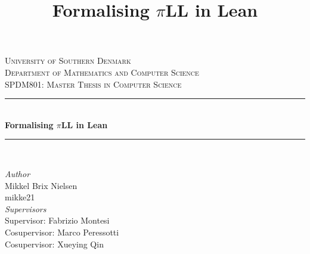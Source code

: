\documentclass[
    final,
    highlight, %
    british, %
    a4paper, %
    acmsmall, %
    acmthm, %
    natbib, %
    screen, %
    review, %
    nonacm, %
]{acmart}
\title[Formalising \texorpdfstring{$\pi$}{pi}LL in Lean]{Formalising \texorpdfstring{$\pi$}{pi}LL in Lean}
\begin{document}
\begin{titlepage}

\newcommand{\HRule}{\rule{\linewidth}{0.5mm}}

\center{} %


	\textsc{\LARGE University of Southern Denmark}\\[1.5cm]

	\textsc{\Large Department of Mathematics and Computer Science}\\[0.5cm]

	\textsc{\large SPDM801: Master Thesis in Computer Science }\\[0.5cm]


	\HRule\\[0.7cm]

	{\huge\bfseries Formalising $\pi$LL in Lean}\\[0.4cm]

	\HRule\\[1.0cm]

    \large   
    \vfill
    \begin{center}
        \begin{minipage}[t]{0.45\textwidth}
            \centering
            \textit{Author}\\[0.3cm]
            \normalsize
            Mikkel Brix Nielsen\\
            {\small mikke21} \\
            \vspace{1cm}
            \centering
            \large   
            \textit{Supervisors}\\[0.3cm]
            \normalsize
            Supervisor: Fabrizio Montesi\\
            Cosupervisor: Marco Peressotti\\
            Cosupervisor: Xueying Qin
        \end{minipage}
    \end{center}


\end{titlepage}
\end{document}
